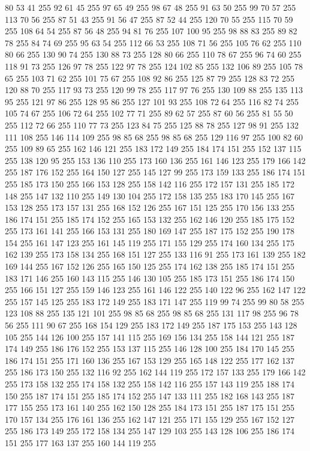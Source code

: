 80 53 41 255 92 61 45 255 97 65 49 255 98 67 48 255 91 63 50 255 99 70 57 255 113 70 56 255 87 51 43 255 91 56 47 255 87 52 44 255 120 70 55 255 115 70 59 255 108 64 54 255 87 56 48 255 94 81 76 255 107 100 95 255 98 88 83 255 89 82 78 255 84 74 69 255 95 63 54 255 112 66 53 255 108 71 56 255 105 76 62 255 110 80 66 255 130 90 74 255 130 88 73 255 128 80 66 255 110 78 67 255 96 74 60 255 118 91 73 255 126 97 78 255 122 97 78 255 124 102 85 255 132 106 89 255 105 78 65 255 103 71 62 255 101 75 67 255 108 92 86 255 125 87 79 255 128 83 72 255 120 88 70 255 117 93 73 255 120 99 78 255 117 97 76 255 130 109 88 255 135 113 95 255 121 97 86 255 128 95 86 255 127 101 93 255 108 72 64 255 116 82 74 255 105 74 67 255 106 72 64 255 102 77 71 255 89 62 57 255 87 60 56 255 81 55 50 255 112 72 66 255 110 77 73 255 123 84 75 255 125 88 78 255 127 98 91 255 132 111 108 255 146 114 109 255
98 85 68 255 98 85 68 255 129 116 97 255 100 82 60 255 109 89 65 255 162 146 121 255 183 172 149 255 184 174 151 255 152 137 115 255 138 120 95 255 153 136 110 255 173 160 136 255 161 146 123 255 179 166 142 255 187 176 152 255 164 150 127 255 145 127 99 255 173 159 133 255 186 174 151 255 185 173 150 255 166 153 128 255 158 142 116 255 172 157 131 255 185 172 148 255 147 132 110 255 149 130 104 255 172 158 135 255 183 170 145 255 167 153 128 255 173 157 131 255 168 152 126 255 167 151 125 255 170 156 133 255 186 174 151 255 185 174 152 255 165 153 132 255 162 146 120 255 185 175 152 255 173 161 141 255 166 153 131 255 180 169 147 255 187 175 152 255 190 178 154 255 161 147 123 255 161 145 119 255 171 155 129 255 174 160 134 255 175 162 139 255 173 158 134 255 168 151 127 255 133 116 91 255 173 161 139 255 182 169 144 255 167 152 126 255 165 150 125 255 174 162 138 255 185 174 151 255 183 171 146 255 160 143 115 255 146 130 105 255 185 173 151 255 186 174 150 255 166 151 127 255 159 146 123 255
161 146 122 255 140 122 96 255 162 147 122 255 157 145 125 255 183 172 149 255 183 171 147 255 119 99 74 255 99 80 58 255 123 108 88 255 135 121 101 255 98 85 68 255 98 85 68 255 131 117 98 255 96 78 56 255 111 90 67 255 168 154 129 255 183 172 149 255 187 175 153 255 143 128 105 255 144 126 100 255 157 141 115 255 169 156 134 255 158 144 121 255 187 174 149 255 186 176 152 255 153 137 115 255 146 128 100 255 184 170 145 255 186 174 151 255 171 160 136 255 167 153 129 255 165 148 122 255 177 162 137 255 186 173 150 255 132 116 92 255 162 144 119 255 172 157 133 255 179 166 142 255 173 158 132 255 174 158 132 255 158 142 116 255 157 143 119 255 188 174 150 255 187 174 151 255 185 174 152 255 147 133 111 255 182 168 143 255 187 177 155 255 173 161 140 255 162 150 128 255 184 173 151 255 187 175 151 255 170 157 134 255 176 161 136 255 162 147 121 255 171 155 129 255 167 152 127 255 186 173 149 255 172 158 134 255 147 129 103 255 143 128 106 255 186 174 151 255 177 163 137 255 160 144 119 255
